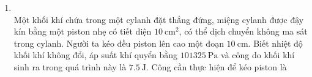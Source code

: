 \begin{enumerate}[label=\bfseries Câu \arabic*:, leftmargin=1.7cm]
\item {}\\
Một khối khí chứa trong một cylanh đặt thẳng đứng, miệng cylanh được đậy kín bằng một piston nhẹ có tiết diện $\SI{10}{\centi\meter^2}$, có thể dịch chuyển không ma sát trong cylanh. Người ta kéo đều piston lên cao một đoạn $\SI{10}{\centi\meter}$. Biết nhiệt độ khối khí không đổi, áp suất khí quyển bằng $\SI{101325}{\pascal}$ và công do khối khí sinh ra trong quá trình này là $\SI{7.5}{\joule}$. Công cần thực hiện để kéo piston là

\end{enumerate}
